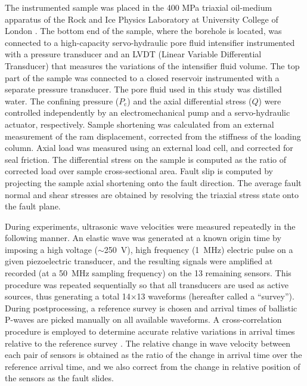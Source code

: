 \documentclass[grl]{agutex2arxiv}
\begin{document}
\begin{article}
The instrumented sample was placed in the 400 MPa triaxial oil-medium apparatus of the Rock and Ice Physics Laboratory at University College of London \citep{Eccles2005}. The bottom end of the sample, where the borehole is located, was connected to a high-capacity servo-hydraulic pore fluid intensifier instrumented with a pressure transducer and an LVDT (Linear Variable Differential Transducer) that measures the variations of the intensifier fluid volume. The top part of the sample was connected to a closed reservoir instrumented with a separate pressure transducer. The pore fluid used in this study was distilled water. The confining pressure ($P_\mathrm{c}$) and the axial differential stress ($Q$) were controlled independently by an electromechanical pump and a servo-hydraulic actuator, respectively. Sample shortening was calculated from an external measurement of the ram displacement, corrected from the stiffness of the loading column. Axial load was measured using an external load cell, and corrected for seal friction. The differential stress on the sample is computed as the ratio of corrected load over sample cross-sectional area. Fault slip is computed by projecting the sample axial shortening onto the fault direction. The average fault normal and shear stresses are obtained by resolving the triaxial stress state onto the fault plane.

During experiments, ultrasonic wave velocities were measured repeatedly in the following manner. An elastic wave was generated at a known origin time by imposing a high voltage ($\sim$250~V), high frequency (1~MHz) electric pulse on a given piezoelectric transducer, and the resulting signals were amplified at recorded (at a 50~MHz sampling frequency) on the 13 remaining sensors. This procedure was repeated sequentially so that all transducers are used as active sources, thus generating a total 14$\times$13 waveforms (hereafter called a ``survey''). During postprocessing, a reference survey is chosen and arrival times of ballistic P-waves are picked manually on all available waveforms. A cross-correlation procedure is employed to determine accurate relative variations in arrival times relative to the reference survey \citep[see details in][]{Brantut2015}. The relative change in wave velocity between each pair of sensors is obtained as the ratio of the change in arrival time over the reference arrival time, and we also correct from the change in relative position of the sensors as the fault slides.


\end{article}
\end{document}
